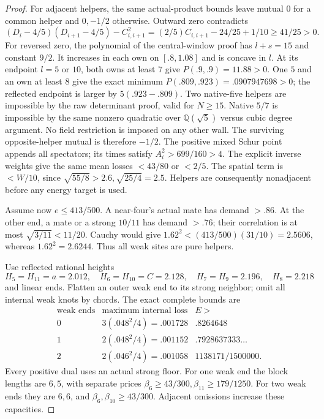 \documentclass[11pt]{article}
\theoremstyle{definition}
\theoremstyle{remark}
\begin{document}
\begin{proof}
For adjacent helpers, the same actual-product
bounds leave mutual \(0\) for a common helper
and \(0,-1/2\) otherwise.
Outward zero contradicts
\[
 (D_i-4/5)(D_{i+1}-4/5)-C_{i,i+1}^2
 =(2/5)C_{i,i+1}-24/25+1/10\geq41/25>0.
\]
For reversed zero, the polynomial of the
central-window proof has \(l+s=15\) and
constant \(9/2\). It increases in each own
on \([.8,1.08]\) and is concave in \(l\).
At its endpoint \(l=5\) or \(10\), both
owns at least \(7\) give \(P(.9,.9)=11.88>0\).
One \(5\) and an own at least \(8\) give
the exact minimum
\(P(.809,.923)=.0907947698>0\);
the reflected endpoint is larger by
\(5(.923-.809)\).
Two native-five helpers are impossible by
the raw determinant proof, valid for \(N\geq15\).
Native \(5/7\) is impossible by the same
nonzero quadratic over \(\mathbb Q(\sqrt5)\)
versus cubic degree argument. No field
restriction is imposed on any other wall.
The surviving opposite-helper mutual is
therefore \(-1/2\).
The positive mixed Schur point appends all
spectators; its times satisfy
\(A_i^2>699/160>4\).
The explicit inverse weights give the same
mean losses \(<43/80\) or \(<2/5\).
The spatial term is \(<W/10\), since
\(\sqrt{55/8}>2.6,\sqrt{25/4}=2.5\).
Helpers are consequently nonadjacent before
any energy target is used.

Assume now \(e\leq413/500\).
A near-four's actual mate has demand \(>.86\).
At the other end, a mate or a strong \(10/11\)
has demand \(>.76\); their correlation is at most
\(\sqrt{3/11}<11/20\).
Cauchy would give
\(1.62^2<(413/500)(31/10)=2.5606\),
whereas \(1.62^2=2.6244\).
Thus all weak sites are pure helpers.

Use reflected rational heights
\[
 H_5=H_{11}=a=2.012,\quad
 H_6=H_{10}=C=2.128,\quad
 H_7=H_9=2.196,\quad H_8=2.218
\]
and linear ends.
Flatten an outer weak end to its strong
neighbor; omit all internal weak knots
by chords. The exact complete bounds are
\[
\begin{array}{c|c|c}
\text{weak ends}&\text{maximum internal loss}&E>\\ \hline
0&3(.048^2/4)=.001728&.8264648\\
1&2(.048^2/4)=.001152&.7928637333\ldots\\
2&2(.046^2/4)=.001058&1138171/1500000.
\end{array}
\]
Every positive dual uses an actual strong
floor. For one weak end the block lengths
are \(6,5\), with separate prices
\(\beta_6\geq43/300,\beta_{11}\geq179/1250\).
For two weak ends they are \(6,6\), and
\(\beta_6,\beta_{10}\geq43/300\).
Adjacent omissions increase these capacities.


\end{proof}
\end{document}

